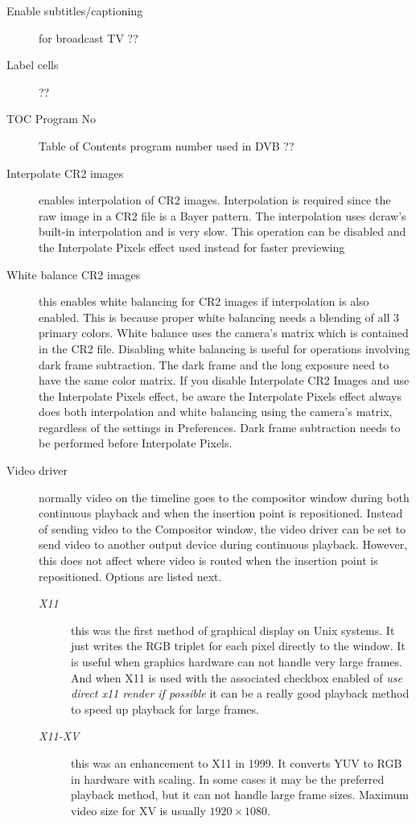 \begin{description}
    \item[Enable subtitles/captioning] for broadcast TV ??
    \item[Label cells] ??
    \item[TOC Program No] Table of Contents program number used in DVB ??
    \item[Interpolate CR2 images] enables interpolation of CR2 images. Interpolation is required since the raw image in a CR2 file is a Bayer pattern. The interpolation uses dcraw's built-in interpolation and is very slow. This operation can be disabled and the Interpolate Pixels effect used instead for faster previewing
    \item[White balance CR2 images] this enables white balancing for CR2 images if interpolation is also enabled. This is because proper white balancing needs a blending of all 3 primary colors. White balance uses the camera's matrix which is contained in the CR2 file.  Disabling white balancing is useful for operations involving dark frame subtraction. The dark frame and the long exposure need to have the same color matrix.  If you disable Interpolate CR2 Images and use the Interpolate Pixels effect, be aware the Interpolate Pixels effect always does both interpolation and white balancing using the camera's matrix, regardless of the settings in Preferences. Dark frame subtraction needs to be performed before Interpolate Pixels.
    \item[Video driver]  normally video on the timeline goes to the compositor window during both continuous   playback and when the insertion point is repositioned. Instead of sending video to the Compositor window, the video driver can be set to send video to another output device during continuous playback. However, this does not affect where video is routed when the insertion point is repositioned. Options are listed next.
    \begin{description}
        \item[\textit{X11}] this was the first method of graphical display on Unix systems. It just writes the RGB triplet for each pixel directly to the window. It is useful when graphics hardware can not handle very large frames.  And when X11 is used with the associated checkbox enabled of \textit{use direct x11 render if possible} it can be a really good playback method to speed up playback for large frames.
        \item[\textit{X11-XV}] this was an enhancement to X11 in 1999. It converts YUV to RGB in hardware with scaling. In some cases it may be the preferred playback method, but it can not handle large frame sizes. Maximum video size for XV is usually $1920\times1080$.

\end{description}
\end{description}

